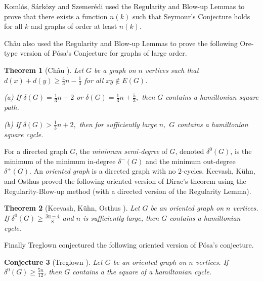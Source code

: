 \documentclass[oneside,12pt]{memoir}
\newtheorem{theorem}{Theorem}[section]
\newtheorem{conjecture}[theorem]{Conjecture}
\begin{document}
Koml\'os, S\'ark\"ozy and Szemer\'edi \cite{KSSps,KSSs} used the Regularity and Blow-up Lemmas to prove that there exists a function $n(k)$ such that Seymour's Conjecture holds for all $k$ and graphs of order at least $n(k)$.

Ch\^au also used the Regularity and Blow-up Lemmas to prove the following Ore-type version of P\'osa's Conjecture for graphs of large order.
\begin{theorem}[Ch\^au \cite{C}]
Let $G$ be a graph on $n$ vertices such that $d(x)+d(y)\geq
\frac{4}{3}n-\frac{1}{3}$ for all $xy\notin E(G)$.

\textup{(a)} If $\delta(G)=\frac{1}{3}n+2$ or $\delta(G)=\frac{1}{3}n+\frac{5}{3},$ then
$G$ contains a hamiltonian square path.

\textup{(b)} If $\delta(G)>\frac{1}{3}n+2,$ then for sufficiently large $n,$ $G$
contains a hamiltonian square cycle.
\end{theorem}

For a directed graph $G$, the \emph{minimum semi-degree} of $G$, denoted $\delta^0(G)$, is the minimum of the minimum in-degree $\delta^-(G)$ and the minimum out-degree $\delta^+(G)$.  An \emph{oriented graph} is a directed graph with no $2$-cycles. Keevash, K\"uhn, and Osthus proved the following oriented version of Dirac's theorem using the Regularity-Blow-up method (with a directed version of the Regularity Lemma).

\begin{theorem}[Keevash, K\"uhn, Osthus \cite{KKO}] Let $G$ be an oriented graph on $n$ vertices.  If $\delta^0(G)\geq \frac{3n-4}{8}$ and $n$ is sufficiently large, then $G$ contains a hamiltonian cycle.
\end{theorem}

Finally Treglown conjectured the following oriented version of P\'osa's conjecture.

\begin{conjecture}[Treglown \cite{Tr}]
Let $G$ be an oriented graph on $n$ vertices.  If $\delta^0(G)\geq \frac{5n}{12}$, then $G$ contains a the square of a hamiltonian cycle.
\end{conjecture}

% 
% 
\end{document}
